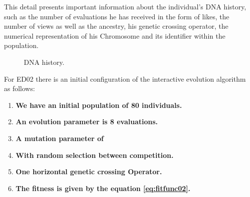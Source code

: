 This detail presents important information about the individual's DNA history,
such as the number of evaluations he has received in the form of likes, the
number of views as well as the ancestry, his genetic crossing operator, the
numerical representation of his Chromosome and its identifier within the
population.


\begin{figure}
\captionsetup{justification=centering,margin=2cm}
\centering
\setlength\fboxsep{0pt}
\setlength\fboxrule{0.7pt}
\caption{DNA history.}
\label{fig:dna}       
\end{figure}

For ED02 there is an initial configuration of the interactive evolution algorithm as follows:

\begin{enumerate}
	\item  \textbf{We have an initial population of 80 individuals.}
	
	\item  \textbf{An evolution parameter is 8 evaluations.}
	
	\item  \textbf{A mutation parameter of } 
	\item  \textbf{With random selection between competition.} 
	\item  \textbf{One horizontal genetic crossing Operator.}
	\item  \textbf{The fitness is given by the equation \ref{eq:fitfunc02}.}
\end{enumerate}

